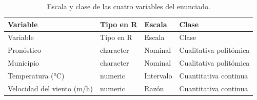 \documentclass[oneside, openany, fontset=libertinus]{mitthesis}
\begin{document}
\begin{longtable}[]{@{}
  >{\raggedright\arraybackslash}p{}
  >{\raggedright\arraybackslash}p{}
  >{\raggedright\arraybackslash}p{}
  >{\raggedright\arraybackslash}p{}@{}}
\caption{Escala y clase de las cuatro variables del
enunciado.}\tabularnewline
\toprule\noalign{}
\begin{minipage}[b]{\linewidth}\raggedright
Variable
\end{minipage} & \begin{minipage}[b]{\linewidth}\raggedright
Tipo en R
\end{minipage} & \begin{minipage}[b]{\linewidth}\raggedright
Escala
\end{minipage} & \begin{minipage}[b]{\linewidth}\raggedright
Clase
\end{minipage} \\
\midrule\noalign{}
\endfirsthead
\toprule\noalign{}
\begin{minipage}[b]{\linewidth}\raggedright
Variable
\end{minipage} & \begin{minipage}[b]{\linewidth}\raggedright
Tipo en R
\end{minipage} & \begin{minipage}[b]{\linewidth}\raggedright
Escala
\end{minipage} & \begin{minipage}[b]{\linewidth}\raggedright
Clase
\end{minipage} \\
\midrule\noalign{}
\endhead
\bottomrule\noalign{}
\endlastfoot
Pronóstico & character & Nominal & Cualitativa politómica \\
Municipio & character & Nominal & Cualitativa politómica \\
Temperatura (°C) & numeric & Intervalo & Cuantitativa continua \\
Velocidad del viento (m/h) & numeric & Razón & Cuantitativa continua \\
\end{longtable}
\end{document}
